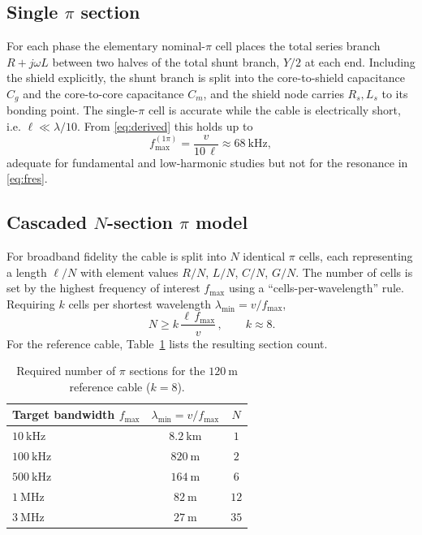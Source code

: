 \documentclass[11pt,a4paper,oneside]{book}
\begin{document}
\begin{onehalfspace}
\begin{appendices}
\subsection{Single $\pi$ section}
For each phase the elementary nominal-$\pi$ cell places the total series branch
$R+j\omega L$ between two halves of the total shunt branch, $Y/2$ at each end.
Including the shield explicitly, the shunt branch is split into the core-to-shield
capacitance $C_g$ and the core-to-core capacitance $C_m$, and the shield node
carries $R_s,L_s$ to its bonding point. The single-$\pi$ cell is accurate while the
cable is electrically short, i.e. $\ell \ll \lambda/10$. From \eqref{eq:derived}
this holds up to
\begin{equation}
	f_{\max}^{(1\pi)}=\frac{v}{10\,\ell}\approx 68\ \mathrm{kHz},
\end{equation}
adequate for fundamental and low-harmonic studies but not for the resonance in
\eqref{eq:fres}.

\subsection{Cascaded $N$-section $\pi$ model}
For broadband fidelity the cable is split into $N$ identical $\pi$ cells, each
representing a length $\ell/N$ with element values $R/N$, $L/N$, $C/N$, $G/N$. The
number of cells is set by the highest frequency of interest $f_{\max}$ using a
``cells-per-wavelength'' rule. Requiring $k$ cells per shortest wavelength
$\lambda_{\min}=v/f_{\max}$,
\begin{equation}
	\boxed{\,N \ge k\,\frac{\ell\,f_{\max}}{v}\,},\qquad k\approx 8 .
	\label{eq:Ncriterion}
\end{equation}
For the reference cable, Table~\ref{tab:N} lists the resulting section count.

\begin{table}[h]
	\centering
	\caption{Required number of $\pi$ sections for the $120\ \mathrm{m}$ reference cable
		($k=8$).}
	\label{tab:N}
	\begin{tabular}{@{}lcc@{}}
		\toprule
		Target bandwidth $f_{\max}$ & $\lambda_{\min}=v/f_{\max}$ & $N$ \\
		\midrule
		$10\ \mathrm{kHz}$  & $8.2\ \mathrm{km}$  & $1$ \\
		$100\ \mathrm{kHz}$ & $820\ \mathrm{m}$   & $2$ \\
		$500\ \mathrm{kHz}$ & $164\ \mathrm{m}$   & $6$ \\
		$1\ \mathrm{MHz}$   & $82\ \mathrm{m}$    & $12$ \\
		$3\ \mathrm{MHz}$   & $27\ \mathrm{m}$    & $35$ \\
		\bottomrule
	\end{tabular}
\end{table}


\end{appendices}
\end{onehalfspace}
\end{document}
